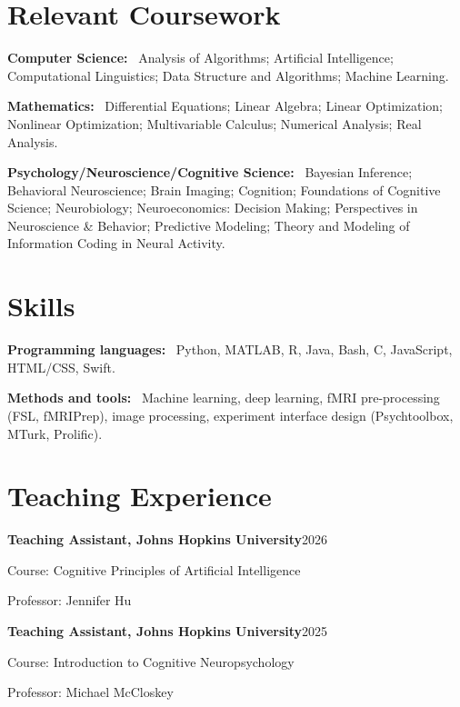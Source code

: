 \documentclass[10pt,letterpaper]{article}
\newcommand{\entry}[2]{\textbf{#1}\hfill #2\par}
\newcommand{\runin}[1]{\textbf{#1}\ }
\begin{document}
\section{Relevant Coursework}
\runin{Computer Science:} Analysis of Algorithms; Artificial Intelligence; Computational Linguistics; Data Structure and Algorithms; Machine Learning.\par
\vspace{4pt}
\runin{Mathematics:} Differential Equations; Linear Algebra; Linear Optimization; Nonlinear Optimization; Multivariable Calculus; Numerical Analysis; Real Analysis.\par
\vspace{4pt}
\runin{Psychology/Neuroscience/Cognitive Science:} Bayesian Inference; Behavioral Neuroscience; Brain Imaging; Cognition; Foundations of Cognitive Science; Neurobiology; Neuroeconomics: Decision Making; Perspectives in Neuroscience \& Behavior; Predictive Modeling; Theory and Modeling of Information Coding in Neural Activity.\par

\section{Skills}
\runin{Programming languages:} Python, MATLAB, R, Java, Bash, C, JavaScript, HTML/CSS, Swift.\par
\vspace{4pt}
\runin{Methods and tools:} Machine learning, deep learning, fMRI pre-processing (FSL, fMRIPrep), image processing, experiment interface design (Psychtoolbox, MTurk, Prolific).\par

\section{Teaching Experience}
\entry{Teaching Assistant, Johns Hopkins University}{2026}
Course: Cognitive Principles of Artificial Intelligence\par
Professor: Jennifer Hu\par
\vspace{8pt}

\entry{Teaching Assistant, Johns Hopkins University}{2025}
Course: Introduction to Cognitive Neuropsychology\par
Professor: Michael McCloskey\par
\vspace{8pt}
\end{document}
